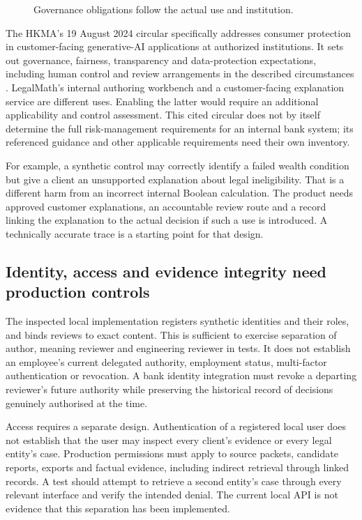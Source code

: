 \begin{figure}[H]
\centering
{}
\caption{Governance obligations follow the actual use and institution.}
\label{fig:ai-governance-perimeter}
\end{figure}

The HKMA's 19 August 2024 circular specifically addresses consumer protection
in customer-facing generative-AI applications at authorized institutions. It
sets out governance, fairness, transparency and data-protection expectations,
including human control and review arrangements in the described circumstances
\citep[pp.~1--4]{hkmagenai2024}. LegalMath's internal authoring workbench and
a customer-facing explanation service are different uses. Enabling the latter
would require an additional applicability and control assessment. This cited
circular does not by itself determine the full risk-management requirements
for an internal bank system; its referenced guidance and other applicable
requirements need their own inventory.

For example, a synthetic control may correctly identify a failed wealth
condition but give a client an unsupported explanation about legal ineligibility.
That is a different harm from an incorrect internal Boolean calculation.
The product needs approved customer explanations, an accountable review route
and a record linking the explanation to the actual decision if such a use is
introduced. A technically accurate trace is a starting point for that design.

\subsection{Identity, access and evidence integrity need production controls}

The inspected local implementation registers synthetic identities and their
roles, and binds reviews to exact content. This is sufficient to exercise
separation of author, meaning reviewer and engineering reviewer in tests.
It does not establish an employee's current delegated authority, employment
status, multi-factor authentication or revocation. A bank identity integration
must revoke a departing reviewer's future authority while preserving the
historical record of decisions genuinely authorised at the time.

Access requires a separate design. Authentication of a registered local user
does not establish that the user may inspect every client's evidence or every
legal entity's case. Production permissions must apply to source packets,
candidate reports, exports and factual evidence, including indirect retrieval
through linked records. A test should attempt to retrieve a second entity's
case through every relevant interface and verify the intended denial. The
current local API is not evidence that this separation has been implemented.

